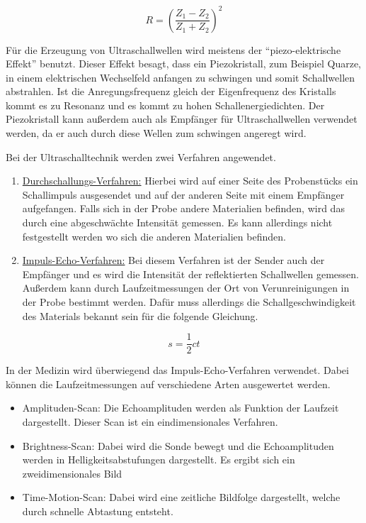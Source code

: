 \begin{equation}
  R = \left( \frac{Z_1 - Z_2}{Z_1 + Z_2} \right)^2
  \label{eq:3}
\end{equation}

Für die Erzeugung von Ultraschallwellen wird meistens der \enquote{piezo-elektrische Effekt}
benutzt. Dieser Effekt besagt, dass ein Piezokristall, zum Beispiel Quarze, in einem
elektrischen Wechselfeld anfangen zu schwingen und somit Schallwellen abstrahlen.
Ist die Anregungsfrequenz gleich der Eigenfrequenz des Kristalls kommt es zu Resonanz
und es kommt zu hohen Schallenergiedichten.
Der Piezokristall kann außerdem auch als Empfänger für Ultraschallwellen verwendet
werden, da er auch durch diese Wellen zum schwingen angeregt wird.

Bei der Ultraschalltechnik werden zwei Verfahren angewendet.

\begin{enumerate}
  \item \underline{Durchschallungs-Verfahren:} Hierbei wird auf einer Seite des Probenstücks
  ein Schallimpuls ausgesendet und auf der anderen Seite mit einem Empfänger aufgefangen.
  Falls sich in der Probe andere Materialien befinden, wird das durch eine abgeschwächte
  Intensität gemessen. Es kann allerdings nicht festgestellt werden wo sich die anderen
  Materialien befinden.
  \item \underline{Impuls-Echo-Verfahren:} Bei diesem Verfahren ist der Sender auch der Empfänger
  und es wird die Intensität der reflektierten Schallwellen gemessen. Außerdem kann
  durch Laufzeitmessungen der Ort von Verunreinigungen in der Probe bestimmt werden.
  Dafür muss allerdings die Schallgeschwindigkeit des Materials bekannt sein für die
  folgende Gleichung.
\end{enumerate}

\begin{equation}
  s = \frac{1}{2} c t
  \label{eq:4}
\end{equation}

In der Medizin wird überwiegend das Impuls-Echo-Verfahren verwendet. Dabei können die
Laufzeitmessungen auf verschiedene Arten ausgewertet werden.

\begin{itemize}
  \item Amplituden-Scan: Die Echoamplituden werden als Funktion der Laufzeit dargestellt.
  Dieser Scan ist ein eindimensionales Verfahren.
  \item Brightness-Scan: Dabei wird die Sonde bewegt und die Echoamplituden werden in
  Helligkeitsabstufungen dargestellt. Es ergibt sich ein zweidimensionales Bild
  \item Time-Motion-Scan: Dabei wird eine zeitliche Bildfolge dargestellt, welche
  durch schnelle Abtastung entsteht.
\end{itemize}

